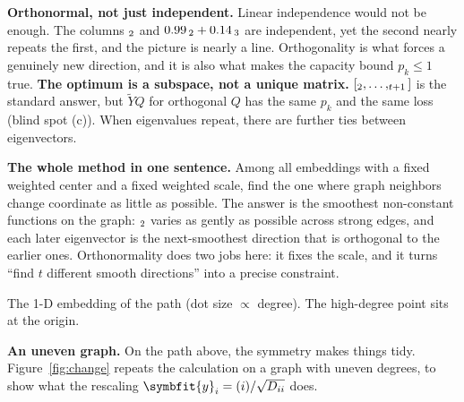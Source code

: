 \documentclass[11pt]{article}
\newcommand{\bm}[1]{\symbfit{#1}}
\let\vv\relax\newcommand{\vv}{\bm{v}}
\begin{document}
\begin{careful}
\textbf{Orthonormal, not just independent.} Linear independence would not be enough. The columns $\vv_2$ and $0.99\,\vv_2+0.14\,\vv_3$ are independent, yet the second nearly repeats the first, and the picture is nearly a line. Orthogonality is what forces a genuinely new direction, and it is also what makes the capacity bound $p_k\le1$ true.
\textbf{The optimum is a subspace, not a unique matrix.} $[\vv_2,\dots,\vv_{t+1}]$ is the standard answer, but $\widetilde YQ$ for orthogonal $Q$ has the same $p_k$ and the same loss (blind spot (c)). When eigenvalues repeat, there are further ties between eigenvectors.
\end{careful}

\begin{intuition}
\textbf{The whole method in one sentence.} Among all embeddings with a fixed weighted center and a fixed weighted scale, find the one where graph neighbors change coordinate as little as possible. The answer is the smoothest non-constant functions on the graph: $\vv_2$ varies as gently as possible across strong edges, and each later eigenvector is the next-smoothest direction that is orthogonal to the earlier ones. Orthonormality does two jobs here: it fixes the scale, and it turns ``find $t$ different smooth directions'' into a precise constraint.
\end{intuition}

\begin{center}

{\small The 1-D embedding of the path (dot size $\propto$ degree). The high-degree point sits at the origin.}
\end{center}

\textbf{An uneven graph.} On the path above, the symmetry makes things tidy. Figure~\ref{fig:change} repeats the calculation on a graph with uneven degrees, to show what the rescaling $\bm y_i=\vv(i)/\sqrt{D_{ii}}$ does.
\end{document}
